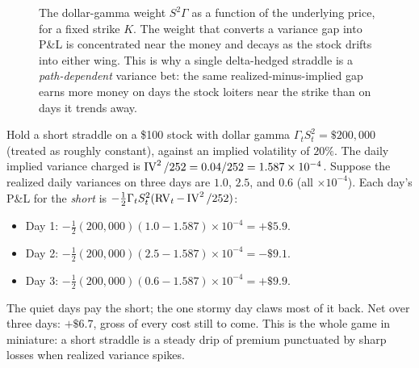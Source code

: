 \begin{figure}[ht]
\centering
{}
\caption{The dollar-gamma weight $S^2\Gamma$ as a function of the underlying price, for a fixed strike $K$. The weight that converts a variance gap into P\&L is concentrated near the money and decays as the stock drifts into either wing. This is why a single delta-hedged straddle is a \emph{path-dependent} variance bet: the same realized-minus-implied gap earns more money on days the stock loiters near the strike than on days it trends away.}
\label{fig:ivrv:dollar-gamma}
\end{figure}

\begin{workedexample}
Hold a short straddle on a \$100 stock with dollar gamma $\Gamma_t S_t^2 = \$200{,}000$ (treated as roughly constant), against an implied volatility of $20\%$. The daily implied variance charged is $\operatorname{IV}^2/252 = 0.04/252 = 1.587\times10^{-4}$. Suppose the realized daily variances on three days are $1.0$, $2.5$, and $0.6$ (all $\times10^{-4}$). Each day's P\&L for the \emph{short} is $-\tfrac12\Gamma_t S_t^2(\operatorname{RV}_t - \operatorname{IV}^2/252)$:
\begin{itemize}
  \item Day 1: $-\tfrac12(200{,}000)(1.0-1.587)\times10^{-4} = +\$5.9$.
  \item Day 2: $-\tfrac12(200{,}000)(2.5-1.587)\times10^{-4} = -\$9.1$.
  \item Day 3: $-\tfrac12(200{,}000)(0.6-1.587)\times10^{-4} = +\$9.9$.
\end{itemize}
The quiet days pay the short; the one stormy day claws most of it back. Net over three days: $+\$6.7$, gross of every cost still to come. This is the whole game in miniature: a short straddle is a steady drip of premium punctuated by sharp losses when realized variance spikes.
\end{workedexample}

